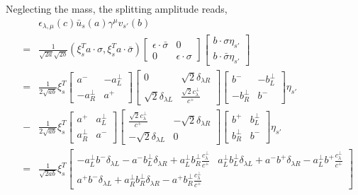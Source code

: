 Neglecting the mass, the splitting amplitude reads,
\begin{eqnarray}
&&\epsilon_{\lambda, \mu}(c) \bar{u}_s(a)\gamma^\mu v_{s'}(b)\\
&=&\frac{1}{\sqrt{2a}\sqrt{2b}}(\xi^T_s a\cdot\sigma, \xi^T_{s} a\cdot \bar{\sigma})
\begin{bmatrix}
\epsilon\cdot\bar{\sigma} & 0 \\
0 & \epsilon\cdot\sigma
\end{bmatrix}
\begin{bmatrix}
b\cdot\sigma \eta_{s'}\\
b\cdot\bar{\sigma} \eta_{s'}
\end{bmatrix}
\\
&=&\frac{1}{2\sqrt{ab}}
\xi_s^T
\begin{bmatrix}
a^- & -a^\perp_L \\
-a^\perp_R & a^+
\end{bmatrix}
\begin{bmatrix}
0 & \sqrt{2}\delta_{\lambda R}\\
\sqrt{2}\delta_{\lambda L} & \frac{\sqrt{2}c^\perp_\lambda}{c^+}
\end{bmatrix}
\begin{bmatrix}
b^- & -b^\perp_L \\
-b^\perp_R & b^-
\end{bmatrix}
\eta_{s'}\\\nonumber
&-&
\frac{1}{2\sqrt{ab}}
\xi_s^T
\begin{bmatrix}
a^+ & a^\perp_L \\
a^\perp_R & a^-
\end{bmatrix}
\begin{bmatrix}
\frac{\sqrt{2}c^\perp_\lambda}{c^+} & -\sqrt{2}\delta_{\lambda R}\\
-\sqrt{2}\delta_{\lambda L} & 0
\end{bmatrix}
\begin{bmatrix}
b^+ & b^\perp_L \\
b^\perp_R & b^-
\end{bmatrix}
\eta_{s'}
\\
&=&\frac{1}{\sqrt{2ab}}
\xi_s^T
\begin{bmatrix}
-a^\perp_L b^- \delta_{\lambda L} - a^- b^\perp_L \delta_{\lambda R} + a^\perp_L b^\perp_R\frac{c^\perp_\lambda}{c^+} &
a^\perp_L b^\perp_L \delta_{\lambda L} + a^- b^+ \delta_{\lambda R} - a^\perp_L b^+\frac{c^\perp_\lambda}{c^+}
\\
a^+ b^- \delta_{\lambda L} + a^\perp_R b^\perp_R \delta_{\lambda R} - a^+ b^\perp_R\frac{c^\perp_\lambda}{c^+} &

\end{bmatrix}
\end{eqnarray}
